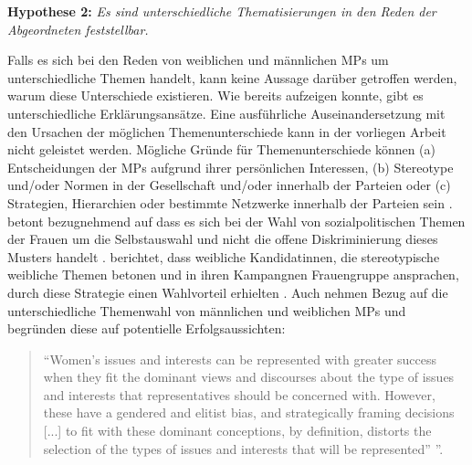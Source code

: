 \documentclass[12pt, 
    twoside=false, 
    bibliography=totoc, 
    numbers=endperiod, 
    headings=normal, 
    toc=chapterentrydotfill
    ]{scrbook}
\begin{document}
\textbf{Hypothese 2:} \emph{Es sind unterschiedliche Thematisierungen in den Reden der Abgeordneten feststellbar.}

Falls es sich bei den Reden von weiblichen und männlichen MPs um unterschiedliche Themen handelt, kann keine Aussage darüber getroffen werden, warum diese Unterschiede existieren. 
Wie \textcite{back_2014} bereits aufzeigen konnte, gibt es unterschiedliche Erklärungsansätze. Eine ausführliche Auseinandersetzung mit den Ursachen der möglichen Themenunterschiede kann in der vorliegen Arbeit nicht geleistet werden. Mögliche Gründe für Themenunterschiede können (a) Entscheidungen der MPs aufgrund ihrer persönlichen Interessen, (b) Stereotype und/oder Normen in der Gesellschaft und/oder innerhalb der Parteien oder (c) Strategien, Hierarchien oder bestimmte Netzwerke innerhalb der Parteien sein \parencites[507]{back_2014}. \textcite [250]{ennser-jedenastik_2017} betont bezugnehmend auf \textcites{baekgaard_2012}{thomas_1994} dass es sich bei der Wahl von sozialpolitischen Themen der Frauen um die Selbstauswahl und nicht die offene Diskriminierung dieses Musters handelt \parencite[250]{ennser-jedenastik_2017}. \textcite{herrnson_2003} berichtet, dass weibliche Kandidatinnen, die stereotypische weibliche Themen betonen und in ihren Kampangnen Frauengruppe ansprachen, durch diese Strategie einen Wahlvorteil erhielten \parencite[250]{ennser-jedenastik_2017}. Auch \textcite{celis_2018} nehmen Bezug auf die unterschiedliche Themenwahl von männlichen und weiblichen MPs und begründen diese auf potentielle Erfolgsaussichten:

\citereset
\begin{quote}
    \enquote{Women’s issues and interests can be represented with greater success when they fit the dominant views and discourses about the type of issues and interests that representatives should be concerned with. However, these have a gendered and elitist bias, and strategically framing decisions [...] to fit with these dominant conceptions, by definition, distorts the selection of the types of issues and interests that will be represented” \parencite[151]{celis_2018}}.
\end{quote}
\end{document}
